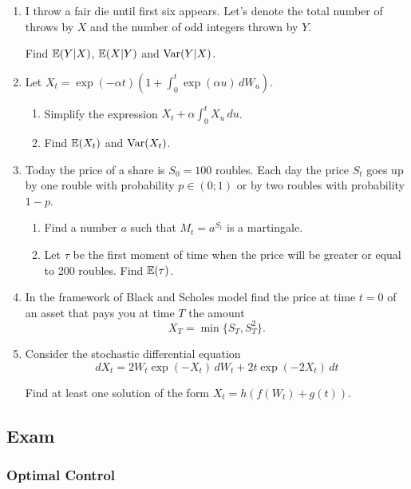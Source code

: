 \documentclass[12pt, a4paper]{article}
\begin{document}
\begin{enumerate}
\item I throw a fair die until first six appears. Let's denote the total number of throws by $X$ and the number of odd integers thrown by $Y$.

Find $\mathbb{E}(Y|X)$, $\mathbb{E}(X|Y)$ and $\operatorname{Var}(Y|X)$.
\item Let $X_t = \exp(-\alpha t) \left(1 + \int_0^t \exp(\alpha u)\, dW_u \right)$.
\begin{enumerate}
  \item Simplify the expression $X_t  + \alpha \int_0^t X_u \, du$.
  \item Find $\mathbb{E}(X_t)$ and $\operatorname{Var}(X_t)$.
\end{enumerate}
\item Today the price of a share is $S_0=100$ roubles. Each day the price $S_t$ goes up  by one rouble with probability $p\in (0;1)$ or by two roubles with probability $1-p$.
\begin{enumerate}
  \item Find a number $a$ such that $M_t = a^{S_t}$ is a martingale.
  \item Let $\tau$ be the first moment of time when the price will be greater or equal to 200 roubles. Find $\mathbb{E}(\tau)$.
\end{enumerate}

\item In the framework of Black and Scholes model find the price at time $t=0$ of an asset that pays you at time $T$ the amount
\[
X_T = \min\{S_T, S_T^2\}.
\]

\item Consider the stochastic differential equation
\[
dX_t = 2W_t \exp(-X_t)\, dW_t + 2t \exp(-2X_t)\, dt
\]

Find at least one solution of the form $X_t = h(f(W_t) + g(t))$.

\end{enumerate}




\subsection{Exam}

\subsubsection*{Optimal Control}
\end{document}
